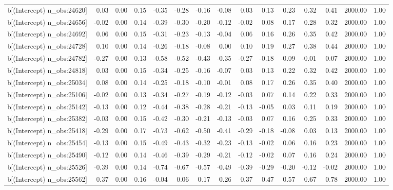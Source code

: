 \begin{table}[ht]
\begin{tabular}{rrrrrrrrrrrrrrr}
  b[(Intercept) n\_obs:24620] & 0.03 & 0.00 & 0.15 & -0.35 & -0.28 & -0.16 & -0.08 & 0.03 & 0.13 & 0.23 & 0.32 & 0.41 & 2000.00 & 1.00 \\ 
  b[(Intercept) n\_obs:24656] & -0.02 & 0.00 & 0.14 & -0.39 & -0.30 & -0.20 & -0.12 & -0.02 & 0.08 & 0.17 & 0.28 & 0.32 & 2000.00 & 1.00 \\ 
  b[(Intercept) n\_obs:24692] & 0.06 & 0.00 & 0.15 & -0.31 & -0.23 & -0.13 & -0.04 & 0.06 & 0.16 & 0.26 & 0.35 & 0.42 & 2000.00 & 1.00 \\ 
  b[(Intercept) n\_obs:24728] & 0.10 & 0.00 & 0.14 & -0.26 & -0.18 & -0.08 & 0.00 & 0.10 & 0.19 & 0.27 & 0.38 & 0.44 & 2000.00 & 1.00 \\ 
  b[(Intercept) n\_obs:24782] & -0.27 & 0.00 & 0.13 & -0.58 & -0.52 & -0.43 & -0.35 & -0.27 & -0.18 & -0.09 & -0.01 & 0.07 & 2000.00 & 1.00 \\ 
  b[(Intercept) n\_obs:24818] & 0.03 & 0.00 & 0.15 & -0.34 & -0.25 & -0.16 & -0.07 & 0.03 & 0.13 & 0.22 & 0.32 & 0.42 & 2000.00 & 1.00 \\ 
  b[(Intercept) n\_obs:25034] & 0.08 & 0.00 & 0.14 & -0.25 & -0.18 & -0.10 & -0.01 & 0.08 & 0.17 & 0.26 & 0.35 & 0.40 & 2000.00 & 1.00 \\ 
  b[(Intercept) n\_obs:25106] & -0.02 & 0.00 & 0.13 & -0.34 & -0.27 & -0.19 & -0.12 & -0.03 & 0.07 & 0.14 & 0.22 & 0.33 & 2000.00 & 1.00 \\ 
  b[(Intercept) n\_obs:25142] & -0.13 & 0.00 & 0.12 & -0.44 & -0.38 & -0.28 & -0.21 & -0.13 & -0.05 & 0.03 & 0.11 & 0.19 & 2000.00 & 1.00 \\ 
  b[(Intercept) n\_obs:25382] & -0.03 & 0.00 & 0.15 & -0.42 & -0.30 & -0.21 & -0.13 & -0.03 & 0.07 & 0.16 & 0.25 & 0.33 & 2000.00 & 1.00 \\ 
  b[(Intercept) n\_obs:25418] & -0.29 & 0.00 & 0.17 & -0.73 & -0.62 & -0.50 & -0.41 & -0.29 & -0.18 & -0.08 & 0.03 & 0.13 & 2000.00 & 1.00 \\ 
  b[(Intercept) n\_obs:25454] & -0.13 & 0.00 & 0.15 & -0.49 & -0.43 & -0.32 & -0.23 & -0.13 & -0.02 & 0.06 & 0.16 & 0.23 & 2000.00 & 1.00 \\ 
  b[(Intercept) n\_obs:25490] & -0.12 & 0.00 & 0.14 & -0.46 & -0.39 & -0.29 & -0.21 & -0.12 & -0.02 & 0.07 & 0.16 & 0.24 & 2000.00 & 1.00 \\ 
  b[(Intercept) n\_obs:25526] & -0.39 & 0.00 & 0.14 & -0.74 & -0.67 & -0.57 & -0.49 & -0.39 & -0.29 & -0.20 & -0.12 & -0.02 & 2000.00 & 1.00 \\ 
  b[(Intercept) n\_obs:25562] & 0.37 & 0.00 & 0.16 & -0.04 & 0.06 & 0.17 & 0.26 & 0.37 & 0.47 & 0.57 & 0.67 & 0.78 & 2000.00 & 1.00 \\ 

\end{tabular}
\end{table}
